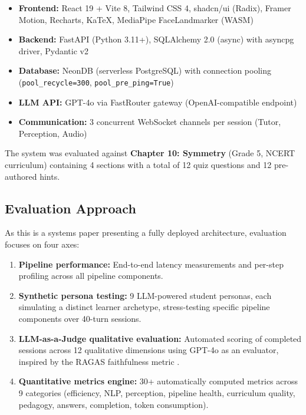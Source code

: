 \documentclass[conference, letterpaper]{IEEEtran}
\begin{document}
\begin{itemize}[nosep]
    \item \textbf{Frontend:} React 19 + Vite 8, Tailwind CSS 4, shadcn/ui (Radix), Framer Motion, Recharts, KaTeX, MediaPipe FaceLandmarker (WASM)
    \item \textbf{Backend:} FastAPI (Python 3.11+), SQLAlchemy 2.0 (async) with asyncpg driver, Pydantic v2
    \item \textbf{Database:} NeonDB (serverless PostgreSQL) with connection pooling (\texttt{pool\_recycle=300}, \texttt{pool\_pre\_ping=True})
    \item \textbf{LLM API:} GPT-4o via FastRouter gateway (OpenAI-compatible endpoint)
    \item \textbf{Communication:} 3 concurrent WebSocket channels per session (Tutor, Perception, Audio)
\end{itemize}

The system was evaluated against \textbf{Chapter 10: Symmetry} (Grade 5, NCERT curriculum) containing 4 sections with a total of 12 quiz questions and 12 pre-authored hints.

\subsection{Evaluation Approach}

As this is a systems paper presenting a fully deployed architecture, evaluation focuses on four axes:

\begin{enumerate}[nosep,label=(\alph*)]
    \item \textbf{Pipeline performance:} End-to-end latency measurements and per-step profiling across all pipeline components.
    \item \textbf{Synthetic persona testing:} 9 LLM-powered student personas, each simulating a distinct learner archetype, stress-testing specific pipeline components over 40-turn sessions.
    \item \textbf{LLM-as-a-Judge qualitative evaluation:} Automated scoring of completed sessions across 12 qualitative dimensions using GPT-4o as an evaluator, inspired by the RAGAS faithfulness metric \cite{ragas2024}.
    \item \textbf{Quantitative metrics engine:} 30+ automatically computed metrics across 9 categories (efficiency, NLP, perception, pipeline health, curriculum quality, pedagogy, answers, completion, token consumption).
\end{enumerate}
\end{document}
